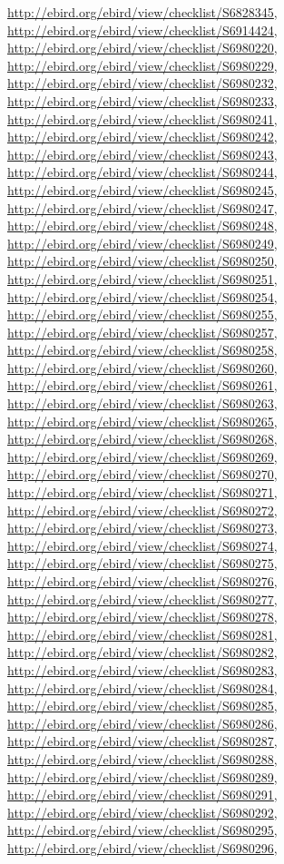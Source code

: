 \documentclass[9pt, article]{memoir}
\begin{document}
\begin{multicols}{2}
\url{http://ebird.org/ebird/view/checklist/S6828345}, 
\url{http://ebird.org/ebird/view/checklist/S6914424}, 
\url{http://ebird.org/ebird/view/checklist/S6980220}, 
\url{http://ebird.org/ebird/view/checklist/S6980229}, 
\url{http://ebird.org/ebird/view/checklist/S6980232}, 
\url{http://ebird.org/ebird/view/checklist/S6980233}, 
\url{http://ebird.org/ebird/view/checklist/S6980241}, 
\url{http://ebird.org/ebird/view/checklist/S6980242}, 
\url{http://ebird.org/ebird/view/checklist/S6980243}, 
\url{http://ebird.org/ebird/view/checklist/S6980244}, 
\url{http://ebird.org/ebird/view/checklist/S6980245}, 
\url{http://ebird.org/ebird/view/checklist/S6980247}, 
\url{http://ebird.org/ebird/view/checklist/S6980248}, 
\url{http://ebird.org/ebird/view/checklist/S6980249}, 
\url{http://ebird.org/ebird/view/checklist/S6980250}, 
\url{http://ebird.org/ebird/view/checklist/S6980251}, 
\url{http://ebird.org/ebird/view/checklist/S6980254}, 
\url{http://ebird.org/ebird/view/checklist/S6980255}, 
\url{http://ebird.org/ebird/view/checklist/S6980257}, 
\url{http://ebird.org/ebird/view/checklist/S6980258}, 
\url{http://ebird.org/ebird/view/checklist/S6980260}, 
\url{http://ebird.org/ebird/view/checklist/S6980261}, 
\url{http://ebird.org/ebird/view/checklist/S6980263}, 
\url{http://ebird.org/ebird/view/checklist/S6980265}, 
\url{http://ebird.org/ebird/view/checklist/S6980268}, 
\url{http://ebird.org/ebird/view/checklist/S6980269}, 
\url{http://ebird.org/ebird/view/checklist/S6980270}, 
\url{http://ebird.org/ebird/view/checklist/S6980271}, 
\url{http://ebird.org/ebird/view/checklist/S6980272}, 
\url{http://ebird.org/ebird/view/checklist/S6980273}, 
\url{http://ebird.org/ebird/view/checklist/S6980274}, 
\url{http://ebird.org/ebird/view/checklist/S6980275}, 
\url{http://ebird.org/ebird/view/checklist/S6980276}, 
\url{http://ebird.org/ebird/view/checklist/S6980277}, 
\url{http://ebird.org/ebird/view/checklist/S6980278}, 
\url{http://ebird.org/ebird/view/checklist/S6980281}, 
\url{http://ebird.org/ebird/view/checklist/S6980282}, 
\url{http://ebird.org/ebird/view/checklist/S6980283}, 
\url{http://ebird.org/ebird/view/checklist/S6980284}, 
\url{http://ebird.org/ebird/view/checklist/S6980285}, 
\url{http://ebird.org/ebird/view/checklist/S6980286}, 
\url{http://ebird.org/ebird/view/checklist/S6980287}, 
\url{http://ebird.org/ebird/view/checklist/S6980288}, 
\url{http://ebird.org/ebird/view/checklist/S6980289}, 
\url{http://ebird.org/ebird/view/checklist/S6980291}, 
\url{http://ebird.org/ebird/view/checklist/S6980292}, 
\url{http://ebird.org/ebird/view/checklist/S6980295}, 
\url{http://ebird.org/ebird/view/checklist/S6980296}, 

\end{multicols}
\end{document}
